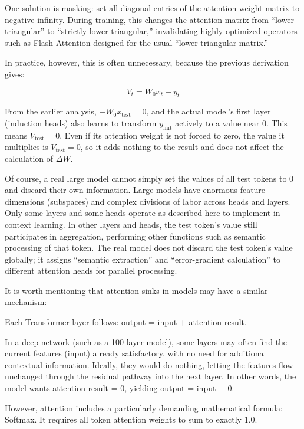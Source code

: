 One solution is masking: set all diagonal entries of the attention-weight matrix to negative infinity. During training, this changes the attention matrix from ``lower triangular'' to ``strictly lower triangular,'' invalidating highly optimized operators such as Flash Attention designed for the usual ``lower-triangular matrix.''

In practice, however, this is often unnecessary, because the previous derivation gives:

\[
V_t = W_0 x_t - y_t
\]

From the earlier analysis, \(-W_0x_{\mathrm{test}}=0\), and the actual model's first layer (induction heads) also learns to transform \(y_{\mathrm{init}}\) actively to a value near 0. This means \(V_{\mathrm{test}}=0\). Even if its attention weight is not forced to zero, the value it multiplies is \(V_{\mathrm{test}}=0\), so it adds nothing to the result and does not affect the calculation of \(\Delta W\).

Of course, a real large model cannot simply set the values of all test tokens to 0 and discard their own information. Large models have enormous feature dimensions (subspaces) and complex divisions of labor across heads and layers. Only some layers and some heads operate as described here to implement in-context learning. In other layers and heads, the test token's value still participates in aggregation, performing other functions such as semantic processing of that token. The real model does not discard the test token's value globally; it assigns ``semantic extraction'' and ``error-gradient calculation'' to different attention heads for parallel processing.

It is worth mentioning that attention sinks in models may have a similar mechanism:

Each Transformer layer follows: output = input + attention result.

In a deep network (such as a 100-layer model), some layers may often find the current features (input) already satisfactory, with no need for additional contextual information. Ideally, they would do nothing, letting the features flow unchanged through the residual pathway into the next layer. In other words, the model wants attention result = 0, yielding output = input + 0.

However, attention includes a particularly demanding mathematical formula: Softmax. It requires all token attention weights to sum to exactly 1.0.

